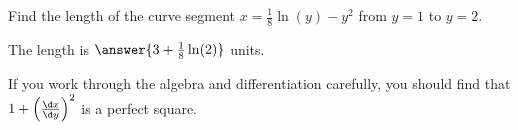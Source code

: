 \documentclass{ximera}
\author{Jim Talamo}
\begin{document}
\begin{exercise}

Find the length of the curve segment $x=\frac{1}{8} \ln(y)-y^2$ from $y=1$ to $y=2$.

The length is $\answer{3+\frac{1}{8} \ln(2)}$ units.

\begin{hint}
If you work through the algebra and differentiation carefully, you should find that $1+\left(\frac{\d x}{\d y}\right)^2$ is a perfect square. 
\end{hint}

\end{exercise}
\end{document}
